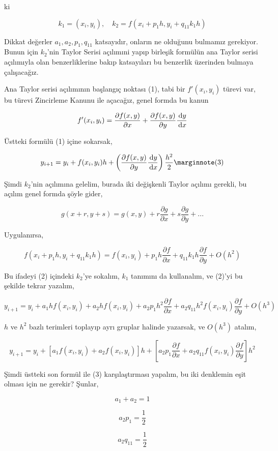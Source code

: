 \documentclass[12pt,fleqn]{article}\usepackage{../../common}
\begin{document}
ki

$$
k_1 = (x_i,y_i), \quad k_2 = f(x_i+p_1 h, y_i + q_{11}k_1h)
$$

Dikkat değerler $a_1,a_2,p_1,q_{11}$ katsayıdır, onların ne olduğunu bulmamız
gerekiyor. Bunun için $k_2$'nin Taylor Serisi açılımıni yapıp birleşik formülün
ana Taylor serisi açılımıyla olan benzerliklerine bakıp katsayıları bu benzerlik
üzerinden bulmaya çalışacağız.

Ana Taylor serisi açılımının başlangıç noktası (1), tabi bir $f'(x_i,y_i)$
türevi var, bu türevi Zincirleme Kanunu ile açacağız, genel formda bu kanun

$$
f'(x_i,y_i) = \frac{\partial f(x,y)}{\partial x} +
\frac{\partial f(x,y)}{\partial y} \frac{\,\mathrm{d} y}{\,\mathrm{d} x}
$$

Üstteki formülü (1) içine sokarsak,

$$
y_{i+1} = y_i + f(x_i,y_i) h +
\left( \frac{\partial f(x,y)}{\partial y} \frac{\ud y}{\ud x}  \right) \frac{h^2}{2}
\mlabel{3}
$$

Şimdi $k_2$'nin açılımına gelelim, burada iki değişkenli Taylor açılımı gerekli,
bu açılım genel formda şöyle gider,

$$
g(x+r,y+s) = g(x,y) + r \frac{\partial g}{\partial x} + s \frac{\partial g}{\partial y} + ...
$$

Uygulanırsa,

$$
f(x_i+p_1 h, y_i + q_{11}k_1h) = f(x_i,y_i) +
p_1 h \frac{\partial f}{\partial x} +
q_{11} k_1 h \frac{\partial f}{\partial y} + O(h^2)
$$

Bu ifadeyi (2) içindeki $k_2$'ye sokalım, $k_1$ tanımını da kullanalım, ve
(2)'yi bu şekilde tekrar yazalım,

$$
y_{i+1} = y_i + a_1 h f(x_i,y_i) + a_2 h f(x_i,y_i) +
a_2 p_1 h^2 \frac{\partial f}{\partial x} +
a_2 q_{11} h^2 f(x_i,y_i) \frac{\partial f}{\partial y} + O(h^3)
$$

$h$ ve $h^2$ bazlı terimleri toplayıp ayrı gruplar halinde yazarsak, ve
$O(h^3)$ atalım,

$$
y_{i+1} = y_i + [a_1 f(x_i,y_i) + a_2 f(x_i,y_i)] h +
\left[a_2 p_1 \frac{\partial f}{\partial x} +
 a_2 q_{11} f(x_i,y_i) \frac{\partial f}{\partial y}
\right] h^2
$$

Şimdi üstteki son formül ile (3) karşılaştırması yapalım, bu iki denklemin eşit
olması için ne gerekir? Şunlar,

$$
a_1 + a_2 = 1
$$

$$
a_2 p_1 = \frac{1}{2}
$$

$$
a_2 q_{11} = \frac{1}{2}
$$
\end{document}
